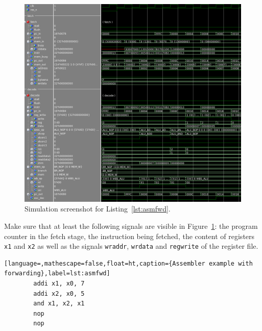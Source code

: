 \begin{figure}[ht!]
	\dummyimage
	\includegraphics[width=1.0\linewidth]{fwd.png}
	\caption{Simulation screenshot for Listing~\ref{lst:asmfwd}.}
	\label{fig:sim1}
\end{figure}

Make sure that at least the following signals are visible in
Figure~\ref{fig:sim1}: the program counter in the fetch stage, the
instruction being fetched, the content of registers \texttt{x1} 
and \texttt{x2} as well as the signals \texttt{wraddr},
\texttt{wrdata} and \texttt{regwrite} of the register file.

\begin{lstlisting}[language=,mathescape=false,float=ht,caption={Assembler example with forwarding},label=lst:asmfwd]
        addi x1, x0, 7
        addi x2, x0, 5
        and x1, x2, x1
        nop
        nop
\end{lstlisting}

